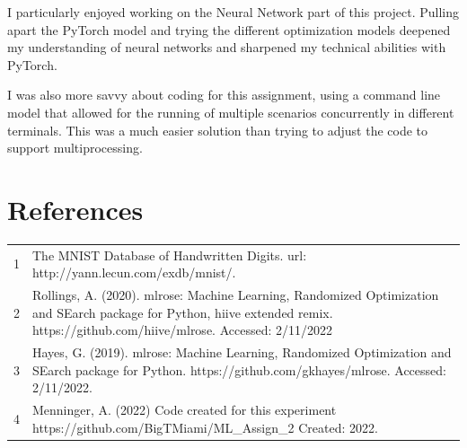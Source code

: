 \documentclass[letterpaper]{article} %
\begin{document}
 I particularly enjoyed working on the Neural Network part of this project.  Pulling apart the PyTorch model and trying the different optimization models deepened my understanding of neural networks and sharpened my technical abilities with PyTorch.  
 
I was also more savvy about coding for this assignment, using a command line model that allowed for the running of multiple scenarios concurrently in different terminals.  This was a much easier solution than trying to adjust the code to support multiprocessing.

\section{References}
\begin{tabular}{l p{2.75in}}
\\
1 & The MNIST Database of Handwritten Digits. url: http://yann.lecun.com/exdb/mnist/.
\\
2 & Rollings, A. (2020). mlrose: Machine Learning, Randomized Optimization and SEarch package for Python, hiive extended remix. https://github.com/hiive/mlrose. Accessed: 2/11/2022
\\
3 & Hayes, G. (2019). mlrose: Machine Learning, Randomized Optimization and SEarch package for Python. https://github.com/gkhayes/mlrose. Accessed: 2/11/2022.
\\
4 & Menninger, A. (2022)  Code created for this experiment https://github.com/BigTMiami/ML\_Assign\_2  Created: 2022.
\end{tabular}
\end{document}
